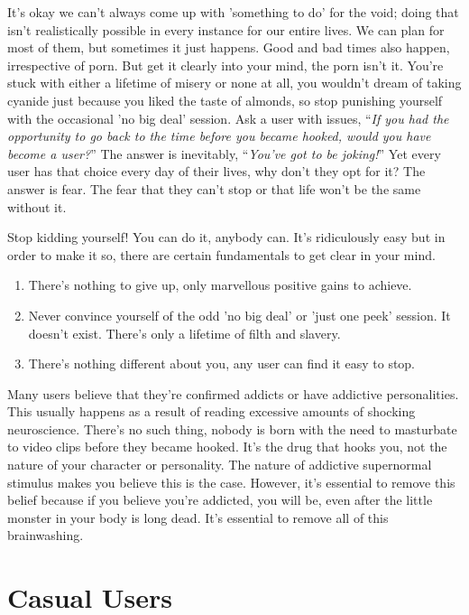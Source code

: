 \documentclass[
]{book}
\begin{document}
It's okay we can't always come up with 'something to do' for the void; doing that isn't realistically possible in every instance for our entire lives. We can plan for most of them, but sometimes it just happens. Good and bad times also happen, irrespective of porn. But get it clearly into your mind, the porn isn't it. You're stuck with either a lifetime of misery or none at all, you wouldn't dream of taking cyanide just because you liked the taste of almonds, so stop punishing yourself with the occasional 'no big deal' session. Ask a user with issues, ``\emph{If you had the opportunity to go back to the time before you became hooked, would you have become a user?}'' The answer is inevitably, ``\emph{You've got to be joking!}'' Yet every user has that choice every day of their lives, why don't they opt for it? The answer is fear. The fear that they can't stop or that life won't be the same without it.

Stop kidding yourself! You can do it, anybody can. It's ridiculously easy but in order to make it so, there are certain fundamentals to get clear in your mind.

\begin{enumerate}
\def\labelenumi{\arabic{enumi}.}
\item
  There's nothing to give up, only marvellous positive gains to achieve.
\item
  Never convince yourself of the odd 'no big deal' or 'just one peek' session. It doesn't exist. There's only a lifetime of filth and slavery.
\item
  There's nothing different about you, any user can find it easy to stop.
\end{enumerate}

Many users believe that they're confirmed addicts or have addictive personalities. This usually happens as a result of reading excessive amounts of shocking neuroscience. There's no such thing, nobody is born with the need to masturbate to video clips before they became hooked. It's the drug that hooks you, not the nature of your character or personality. The nature of addictive supernormal stimulus makes you believe this is the case. However, it's essential to remove this belief because if you believe you're addicted, you will be, even after the little monster in your body is long dead. It's essential to remove all of this brainwashing.

\hypertarget{casual-users}{%
\chapter{Casual Users}\label{casual-users}}
\end{document}
